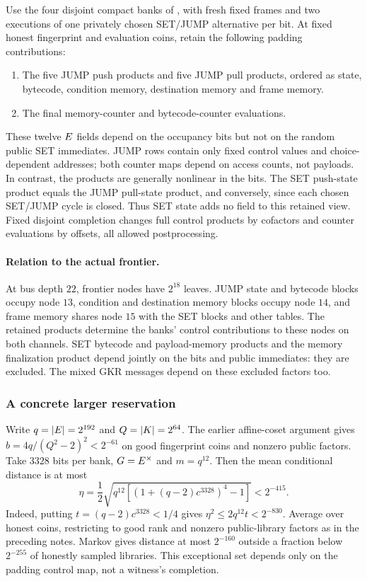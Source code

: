 Use the four disjoint compact banks of , with fresh fixed frames and two executions of one privately chosen SET/JUMP alternative per bit. At fixed honest fingerprint and evaluation coins, retain the following padding contributions:
\begin{enumerate}
\item The five JUMP push products and five JUMP pull products, ordered as state, bytecode, condition memory, destination memory and frame memory.
\item The final memory-counter and bytecode-counter evaluations.
\end{enumerate}
These twelve $E$ fields depend on the occupancy bits but not on the random public SET immediates. JUMP rows contain only fixed control values and choice-dependent addresses; both counter maps depend on access counts, not payloads. In contrast, the products are generally nonlinear in the bits. The SET push-state product equals the JUMP pull-state product, and conversely, since each chosen SET/JUMP cycle is closed. Thus SET state adds no field to this retained view. Fixed disjoint completion changes full control products by cofactors and counter evaluations by offsets, all allowed postprocessing.

\paragraph{Relation to the actual frontier.} At bus depth $22$, frontier nodes have $2^{18}$ leaves. JUMP state and bytecode blocks occupy node $13$, condition and destination memory blocks occupy node $14$, and frame memory shares node $15$ with the SET blocks and other tables. The retained products determine the banks' control contributions to these nodes on both channels. SET bytecode and payload-memory products and the memory finalization product depend jointly on the bits and public immediates: they are excluded. The mixed GKR messages depend on these excluded factors too.

\subsubsection{A concrete larger reservation}

Write $q=|E|=2^{192}$ and $Q=|K|=2^{64}$. The earlier affine-coset argument gives $b=4q/(Q^2-2)^2<2^{-61}$ on good fingerprint coins and nonzero public factors. Take $3328$ bits per bank, $G=E^\times$ and $m=q^{12}$. Then the mean conditional distance is at most
\[
 \eta=\frac12\sqrt{q^{12}\left[(1+(q-2)c^{3328})^4-1\right]}<2^{-415}.
\]
Indeed, putting $t=(q-2)c^{3328}<1/4$ gives $\eta^2\le2q^{12}t<2^{-830}$. Average over honest coins, restricting to good rank and nonzero public-library factors as in the preceding notes. Markov gives distance at most $2^{-160}$ outside a fraction below $2^{-255}$ of honestly sampled libraries. This exceptional set depends only on the padding control map, not a witness's completion.

